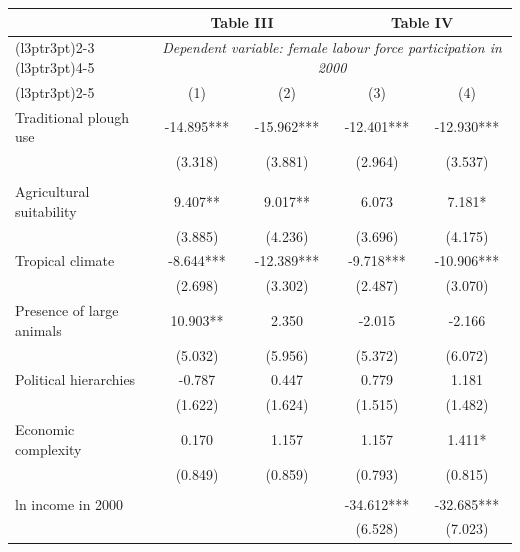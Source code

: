 
\begin{tabular}[t]{lcccc}
\toprule
\multicolumn{1}{c}{ } & \multicolumn{2}{c}{Table III} & \multicolumn{2}{c}{Table IV} \\
\cmidrule(l{3pt}r{3pt}){2-3} \cmidrule(l{3pt}r{3pt}){4-5}
\multicolumn{1}{c}{\em{ }} & \multicolumn{4}{c}{\em{Dependent variable: female labour force participation in 2000}} \\
\cmidrule(l{3pt}r{3pt}){2-5}
 & (1) & (2) & (3) & (4)\\
\midrule
Traditional plough use & -14.895*** & -15.962*** & -12.401*** & -12.930***\\
 & (3.318) & (3.881) & (2.964) & (3.537)\\
\addlinespace[0.3em]
\multicolumn{5}{l}{\textit{Historical controls:}}\\
\hspace{1em}Agricultural suitability & 9.407** & 9.017** & 6.073 & 7.181*\\
\hspace{1em} & (3.885) & (4.236) & (3.696) & (4.175)\\
\hspace{1em}Tropical climate & -8.644*** & -12.389*** & -9.718*** & -10.906***\\
\hspace{1em} & (2.698) & (3.302) & (2.487) & (3.070)\\
\hspace{1em}Presence of large animals & 10.903** & 2.350 & -2.015 & -2.166\\
\hspace{1em} & (5.032) & (5.956) & (5.372) & (6.072)\\
\hspace{1em}Political hierarchies & -0.787 & 0.447 & 0.779 & 1.181\\
\hspace{1em} & (1.622) & (1.624) & (1.515) & (1.482)\\
\hspace{1em}Economic complexity & 0.170 & 1.157 & 1.157 & 1.411*\\
\hspace{1em} & (0.849) & (0.859) & (0.793) & (0.815)\\
\addlinespace[0.3em]
\multicolumn{5}{l}{\textit{Contemporary controls:}}\\
\hspace{1em}ln income in 2000 &  &  & -34.612*** & -32.685***\\
\hspace{1em} &  &  & (6.528) & (7.023)\\

\end{tabular}
